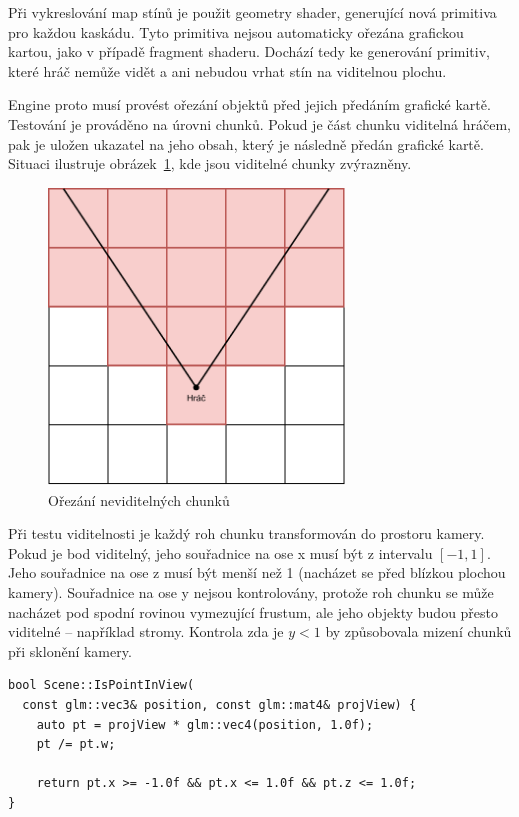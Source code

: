 \documentclass[thesis=M,czech]{FITthesis}[2019/12/23]
\begin{document}
Při vykreslování map stínů je použit geometry shader, generující nová primitiva pro každou kaskádu. Tyto primitiva nejsou automaticky ořezána grafickou kartou, jako v případě fragment shaderu. Dochází tedy ke generování primitiv, které hráč nemůže vidět a ani nebudou vrhat stín na viditelnou plochu.

Engine proto musí provést ořezání objektů před jejich předáním grafické kartě. Testování je prováděno na úrovni chunků. Pokud je část chunku viditelná hráčem, pak je uložen ukazatel na jeho obsah, který je následně předán grafické kartě. Situaci ilustruje obrázek~\ref{fig:visible_chunks}, kde jsou viditelné chunky zvý\-raz\-něny.

\begin{figure}\centering
	\includegraphics[width=0.7\textwidth]{images/visible_chunks}
	\caption[Ořezání neviditelných chunků]{Ořezání neviditelných chunků}\label{fig:visible_chunks}
\end{figure}

Při testu viditelnosti je každý roh chunku transformován do prostoru kamery. Pokud je bod viditelný, jeho souřadnice na ose x musí být z intervalu $[-1, 1]$. Jeho souřadnice na ose z musí být menší než 1 (nacházet se před blízkou plochou kamery). Souřadnice na ose y nejsou kontrolovány, protože roh chunku se může nacházet pod spodní rovinou vymezující frustum, ale jeho objekty budou přesto viditelné -- například stromy. Kontrola zda je $y < 1$ by způsobovala mizení chunků při sklonění kamery.

\begin{verbatim}
bool Scene::IsPointInView(
  const glm::vec3& position, const glm::mat4& projView) {
    auto pt = projView * glm::vec4(position, 1.0f);
    pt /= pt.w;

    return pt.x >= -1.0f && pt.x <= 1.0f && pt.z <= 1.0f;
}
\end{verbatim}
\end{document}
